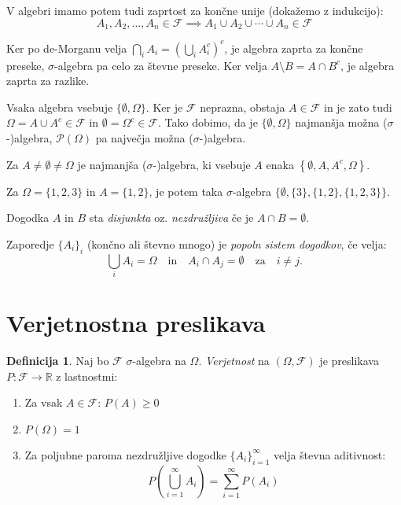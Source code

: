 \documentclass[12pt]{book}
\def\n{\noindent}
\theoremstyle{definition}
\newtheorem{definicija}{Definicija}
\theoremstyle{plain}
\theoremstyle{plain}
\theoremstyle{plain}
\theoremstyle{remark}
\begin{document}
\n V algebri imamo potem tudi zaprtost za končne unije (dokažemo z indukcijo): 
$$A_1, A_2, \ldots, A_n \in \mathcal{F} \implies A_1 \cup A_2 \cup \cdots \cup A_n \in \mathcal{F}$$ 

\n Ker po de-Morganu velja $\bigcap_i A_i=\left(\bigcup_i A_i^c\right)^c$, je algebra zaprta za končne preseke, $\sigma$-algebra pa celo za števne preseke. Ker velja $A \setminus B=A \cap B^c$, je algebra zaprta za razlike. 

\n Vsaka algebra vsebuje $\{\emptyset, \Omega\}$. Ker je $\mathcal{F}$ neprazna, obstaja $A \in \mathcal{F}$ in je zato tudi $\Omega=A \cup A^c \in \mathcal{F}$ in $\emptyset=\Omega^c \in \mathcal{F}$. Tako dobimo, da je $\{\emptyset, \Omega\}$ najmanšja možna ($\sigma$-)algebra, $\mathcal{P}(\Omega)$ pa največja možna ($\sigma$-)algebra.

\begin{zgled}
    Za $A \neq \emptyset \neq \Omega$ je najmanjša ($\sigma$-)algebra, ki vsebuje $A$ enaka $\left\{\emptyset, A, A^c, \Omega\right\}$. 

    \n Za $\Omega=\{1,2,3\}$ in $A=\{1,2\}$, je potem taka $\sigma$-algebra $\{\emptyset,\{3\},\{1,2\},\{1,2,3\}\}$.
\end{zgled}

\n Dogodka $A$ in $B$ sta \emph{disjunkta} oz. \emph{nezdružljiva} če je $A \cap B=\emptyset$. 

\n Zaporedje $\{A_i\}_i$ (končno ali števno mnogo) je \emph{popoln sistem dogodkov}, če velja: $$\bigcup_i A_i=\Omega \quad \text{in} \quad A_i \cap A_j = \emptyset \quad \text{za} \quad i \neq j.$$ 

\section{Verjetnostna preslikava}

\begin{definicija}
    Naj bo $\mathcal{F}$ $\sigma$-algebra na $\Omega$. \emph{Verjetnost} na $(\Omega, \mathcal{F})$ je preslikava $P:\mathcal{F} \to \mathbb{R}$ z lastnostmi:
    \begin{enumerate}
        \item Za vsak $A \in \mathcal{F}$: $P(A) \geq 0 $
        \item $P(\Omega) = 1$
        \item Za poljubne paroma nezdružljive dogodke $\{A_i\}_{i=1}^{\infty}$ velja števna aditivnost: $$P\left(\bigcup_{i=1}^{\infty} A_i\right)=\sum_{i=1}^{\infty} P\left(A_i\right)$$
    \end{enumerate}
\end{definicija}
\end{document}
